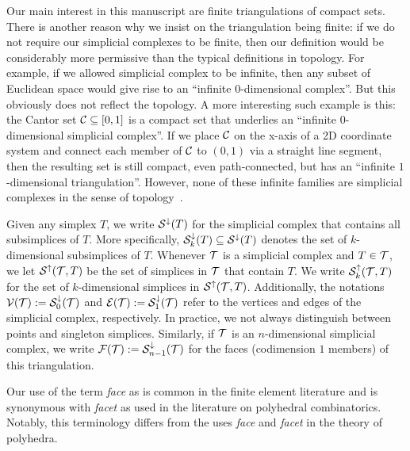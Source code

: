 \documentclass[a4paper]{article}
\begin{document}
\begin{remark}
    Our main interest in this manuscript are finite triangulations of compact sets. 
    There is another reason why we insist on the triangulation being finite: 
    if we do not require our simplicial complexes to be finite,
    then our definition would be considerably more permissive than the typical definitions in topology. 
    For example, if we allowed simplicial complex to be infinite, 
    then any subset of Euclidean space would give rise to an ``infinite $0$-dimensional complex''. But this obviously does not reflect the topology. 
    A more interesting such example is this:
    the Cantor set ${\mathcal C} \subseteq [0,1]$ is a compact set 
    that underlies an ``infinite $0$-dimensional simplicial complex''.
    If we place ${\mathcal C}$ on the x-axis of a 2D coordinate system 
    and connect each member of ${\mathcal C}$ to $(0,1)$ via a straight line segment, 
    then the resulting set is still compact, even path-connected,  
    but has an ``infinite $1$-dimensional triangulation''.
    However, none of these infinite families are simplicial complexes in the sense of topology~\cite{spanier1966homology}. 
\end{remark}


Given any simplex $T$, we write ${\mathcal S}^{\downarrow}(T)$ for the simplicial complex that contains all subsimplices of $T$. 
More specifically, ${\mathcal S}^{\downarrow}_{{k}}(T) \subseteq {\mathcal S}^{\downarrow}(T)$ denotes the set of $k$-dimensional subsimplices of $T$. 
Whenever ${\mathcal T}$ is a simplicial complex and $T \in {\mathcal T}$, we let ${\mathcal S}^{\uparrow}({\mathcal T},T)$ be the set of simplices in ${\mathcal T}$ that contain $T$.
We write ${\mathcal S}^{\uparrow}_{k}({\mathcal T},T)$ for the set of $k$-dimensional simplices in ${\mathcal S}^{\uparrow}({\mathcal T},T)$. 
Additionally, the notations ${\mathcal V}({\mathcal T}) := {\mathcal S}^{\downarrow}_{0}({\mathcal T})$ and ${\mathcal E}({\mathcal T}) := {\mathcal S}^{\downarrow}_{1}({\mathcal T})$ refer to the vertices and edges of the simplicial complex, respectively. 
In practice, we not always distinguish between points and singleton simplices. %
Similarly, if ${\mathcal T}$ is an $n$-dimensional simplicial complex, we write ${\mathcal F}({\mathcal T}) := {\mathcal S}^{\downarrow}_{n-1}({\mathcal T})$ for the faces (codimension $1$ members) of this triangulation. 

\begin{remark}
    Our use of the term \textit{face} as is common in the finite element literature
    and is synonymous with \textit{facet} as used in the literature on polyhedral combinatorics.
    Notably, this terminology differs from the uses \textit{face} and \textit{facet} in the theory of polyhedra. 
\end{remark}
\end{document}
